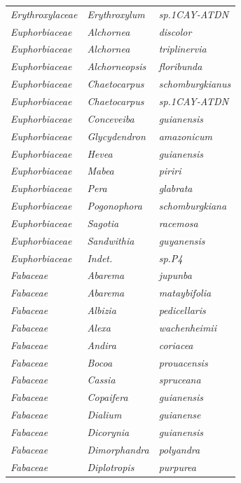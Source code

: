 \documentclass[fleqn,10pt]{ArtEcoFoG} %
\begin{document}
\begin{table}[t]
\begin{tabular}{lll}
\em{Erythroxylaceae} & \em{Erythroxylum} & \em{sp.1CAY-ATDN}\\
\addlinespace
\em{Euphorbiaceae} & \em{Alchornea} & \em{discolor}\\
\em{Euphorbiaceae} & \em{Alchornea} & \em{triplinervia}\\
\em{Euphorbiaceae} & \em{Alchorneopsis} & \em{floribunda}\\
\em{Euphorbiaceae} & \em{Chaetocarpus} & \em{schomburgkianus}\\
\em{Euphorbiaceae} & \em{Chaetocarpus} & \em{sp.1CAY-ATDN}\\
\addlinespace
\em{Euphorbiaceae} & \em{Conceveiba} & \em{guianensis}\\
\em{Euphorbiaceae} & \em{Glycydendron} & \em{amazonicum}\\
\em{Euphorbiaceae} & \em{Hevea} & \em{guianensis}\\
\em{Euphorbiaceae} & \em{Mabea} & \em{piriri}\\
\em{Euphorbiaceae} & \em{Pera} & \em{glabrata}\\
\addlinespace
\em{Euphorbiaceae} & \em{Pogonophora} & \em{schomburgkiana}\\
\em{Euphorbiaceae} & \em{Sagotia} & \em{racemosa}\\
\em{Euphorbiaceae} & \em{Sandwithia} & \em{guyanensis}\\
\em{Euphorbiaceae} & \em{Indet.} & \em{sp.P4}\\
\em{Fabaceae} & \em{Abarema} & \em{jupunba}\\
\addlinespace
\em{Fabaceae} & \em{Abarema} & \em{mataybifolia}\\
\em{Fabaceae} & \em{Albizia} & \em{pedicellaris}\\
\em{Fabaceae} & \em{Alexa} & \em{wachenheimii}\\
\em{Fabaceae} & \em{Andira} & \em{coriacea}\\
\em{Fabaceae} & \em{Bocoa} & \em{prouacensis}\\
\addlinespace
\em{Fabaceae} & \em{Cassia} & \em{spruceana}\\
\em{Fabaceae} & \em{Copaifera} & \em{guianensis}\\
\em{Fabaceae} & \em{Dialium} & \em{guianense}\\
\em{Fabaceae} & \em{Dicorynia} & \em{guianensis}\\
\em{Fabaceae} & \em{Dimorphandra} & \em{polyandra}\\
\addlinespace
\em{Fabaceae} & \em{Diplotropis} & \em{purpurea}\\

\end{tabular}
\end{table}
\end{document}
